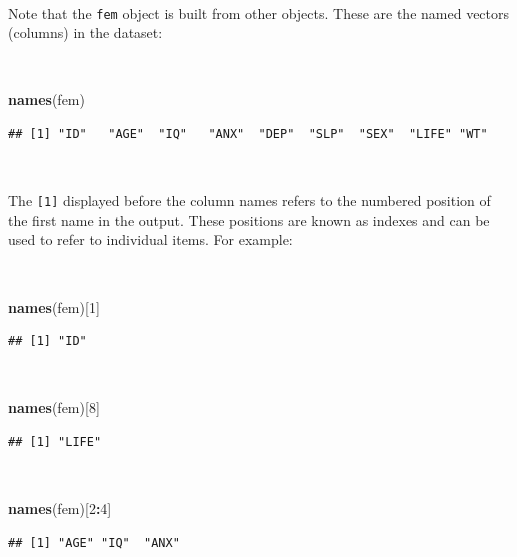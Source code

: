 \documentclass[12pt,a4paper]{book}
\newenvironment{Shaded}{\begin{snugshade}}{\end{snugshade}}
\newcommand{\DecValTok}[1]{\textcolor[rgb]{0.00,0.00,0.81}{#1}}
\newcommand{\KeywordTok}[1]{\textcolor[rgb]{0.13,0.29,0.53}{\textbf{#1}}}
\newcommand{\NormalTok}[1]{#1}
\newcommand{\OperatorTok}[1]{\textcolor[rgb]{0.81,0.36,0.00}{\textbf{#1}}}
\theoremstyle{definition}
\theoremstyle{definition}
\theoremstyle{definition}
\theoremstyle{remark}
\begin{document}
~

Note that the \texttt{fem} object is built from other objects. These are
the named vectors (columns) in the dataset:

~

\begin{Shaded}
\begin{Highlighting}[]
\KeywordTok{names}\NormalTok{(fem)}
\end{Highlighting}
\end{Shaded}

\begin{verbatim}
## [1] "ID"   "AGE"  "IQ"   "ANX"  "DEP"  "SLP"  "SEX"  "LIFE" "WT"
\end{verbatim}

~

The \texttt{{[}1{]}} displayed before the column names refers to the
numbered position of the first name in the output. These positions are
known as indexes and can be used to refer to individual items. For
example:

~

\begin{Shaded}
\begin{Highlighting}[]
\KeywordTok{names}\NormalTok{(fem)[}\DecValTok{1}\NormalTok{]}
\end{Highlighting}
\end{Shaded}

\begin{verbatim}
## [1] "ID"
\end{verbatim}

~

\begin{Shaded}
\begin{Highlighting}[]
\KeywordTok{names}\NormalTok{(fem)[}\DecValTok{8}\NormalTok{]}
\end{Highlighting}
\end{Shaded}

\begin{verbatim}
## [1] "LIFE"
\end{verbatim}

~

\begin{Shaded}
\begin{Highlighting}[]
\KeywordTok{names}\NormalTok{(fem)[}\DecValTok{2}\OperatorTok{:}\DecValTok{4}\NormalTok{]}
\end{Highlighting}
\end{Shaded}

\begin{verbatim}
## [1] "AGE" "IQ"  "ANX"
\end{verbatim}
\end{document}
